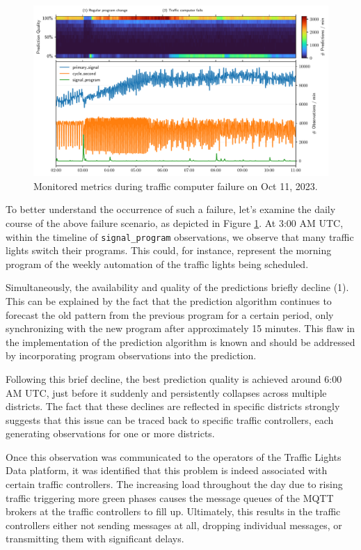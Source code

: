 \begin{figure}[t]
    \centering
    \includegraphics[width=\linewidth]{images/monitoring-failure.pdf}
    \caption{Monitored metrics during traffic computer failure on Oct 11, 2023.}\label{fig:monitoring-failure}
\end{figure}

To better understand the occurrence of such a failure, let's examine the daily course of the above failure scenario, as depicted in Figure \ref{fig:monitoring-failure}. At 3:00 AM UTC, within the timeline of \texttt{signal\_program} observations, we observe that many traffic lights switch their programs. This could, for instance, represent the morning program of the weekly automation of the traffic lights being scheduled.

Simultaneously, the availability and quality of the predictions briefly decline (1). This can be explained by the fact that the prediction algorithm continues to forecast the old pattern from the previous program for a certain period, only synchronizing with the new program after approximately 15 minutes. This flaw in the implementation of the prediction algorithm is known and should be addressed by incorporating program observations into the prediction.

Following this brief decline, the best prediction quality is achieved around 6:00 AM UTC, just before it suddenly and persistently collapses across multiple districts. The fact that these declines are reflected in specific districts strongly suggests that this issue can be traced back to specific traffic controllers, each generating observations for one or more districts. 

Once this observation was communicated to the operators of the Traffic Lights Data platform, it was identified that this problem is indeed associated with certain traffic controllers. The increasing load throughout the day due to rising traffic triggering more green phases causes the message queues of the MQTT brokers at the traffic controllers to fill up. Ultimately, this results in the traffic controllers either not sending messages at all, dropping individual messages, or transmitting them with significant delays.


